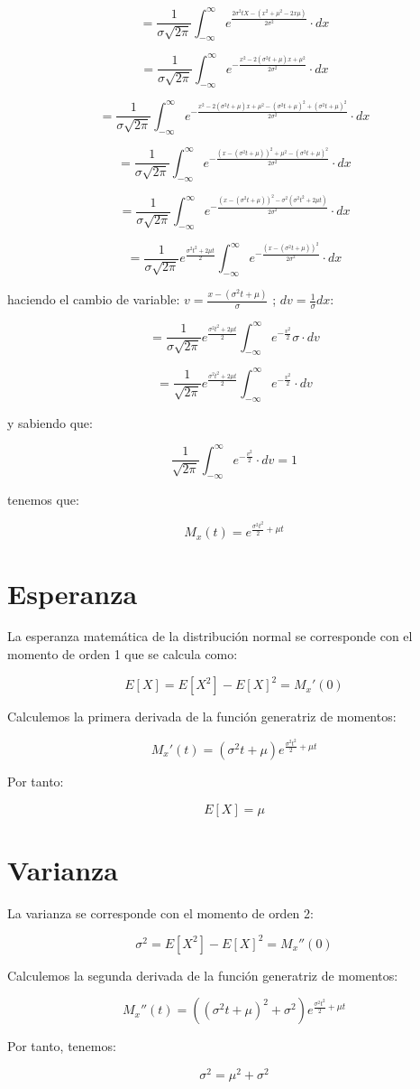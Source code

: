 \documentclass[paper=a4, fontsize=11pt, spanish]{scrartcl}
\begin{document}
$$
= \frac{1}{\sigma \sqrt{2\pi}} \int_{-\infty}^{\infty} e^{\frac{2\sigma^2tX-(x^2+\mu^2-2x\mu)}{2\sigma^2}} \cdot dx
$$

$$
= \frac{1}{\sigma \sqrt{2\pi}} \int_{-\infty}^{\infty} e^{-\frac{x^2-2(\sigma^2t+\mu)x + \mu^2}{2\sigma^2}} \cdot dx
$$

$$
= \frac{1}{\sigma \sqrt{2\pi}} \int_{-\infty}^{\infty} e^{-\frac{x^2-2(\sigma^2t+\mu)x + \mu^2 - (\sigma^2t+\mu)^2+(\sigma^2t+\mu)^2}{2\sigma^2}} \cdot dx
$$

$$
= \frac{1}{\sigma \sqrt{2\pi}} \int_{-\infty}^{\infty} e^{-\frac{(x-(\sigma^2t+\mu))^2 + \mu^2 - (\sigma^2t+\mu)^2}{2\sigma^2}} \cdot dx
$$

$$
= \frac{1}{\sigma \sqrt{2\pi}} \int_{-\infty}^{\infty} e^{-\frac{(x-(\sigma^2t+\mu))^2 - \sigma^2(\sigma^2t^2+2\mu t)}{2\sigma^2}} \cdot dx
$$

$$
= \frac{1}{\sigma \sqrt{2\pi}}e^\frac{\sigma^2t^2+2\mu t}{2} \int_{-\infty}^{\infty} e^{-\frac{(x-(\sigma^2t+\mu))^2}{2\sigma^2}} \cdot dx
$$

haciendo el cambio de variable: $v=\frac{x-(\sigma^2t+\mu)}{\sigma}$ ; $dv=\frac{1}{\sigma} dx$:

$$
= \frac{1}{\sigma \sqrt{2\pi}}e^\frac{\sigma^2t^2+2\mu t}{2} \int_{-\infty}^{\infty} e^{-\frac{v^2}{2}}\sigma \cdot dv
$$

$$
= \frac{1}{\sqrt{2\pi}}e^\frac{\sigma^2t^2+2\mu t}{2} \int_{-\infty}^{\infty} e^{-\frac{v^2}{2}} \cdot dv
$$

y sabiendo que: 

$$
\frac{1}{\sqrt{2\pi}} \int_{-\infty}^{\infty} e^{-\frac{v^2}{2}} \cdot dv = 1
$$

tenemos que:

$$
M_x(t) = e^{\frac{\sigma^2t^2}{2}+\mu t}
$$

\section{Esperanza}
La esperanza matemática de la distribución normal se corresponde con el momento de orden 1 que se calcula como:

$$
E[X]=E[X^2]-E[X]^2=M_x'(0)
$$

Calculemos la primera derivada de la función generatriz de momentos:

$$
M_x'(t)=(\sigma^2t+\mu)e^{\frac{\sigma^2t^2}{2}+\mu t}
$$

Por tanto:

$$
E[X]=\mu
$$

\section{Varianza}
La varianza se corresponde con el momento de orden 2:

$$
\sigma^2=E[X^2]-E[X]^2=M_x''(0)
$$

Calculemos la segunda derivada de la función generatriz de momentos:

$$
M_x''(t)=((\sigma^2t+\mu)^2+\sigma^2)e^{\frac{\sigma^2t^2}{2}+\mu t}
$$

Por tanto, tenemos:

$$
\sigma^2=\mu^2+\sigma^2
$$
\end{document}

